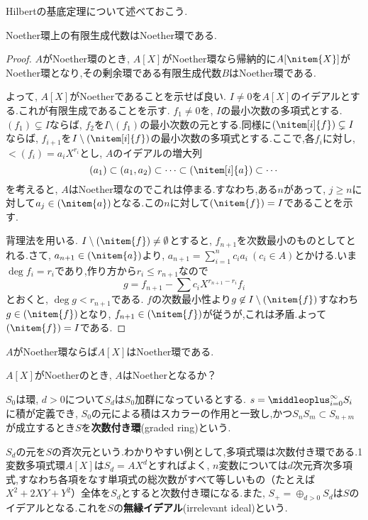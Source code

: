 Hilbertの基底定理について述べておこう.
\begin{thm}[Hilbertの基底定理]\label{thm:Hilbertの基底定理}
		Noether環上の有限生成代数はNoether環である.
	\end{thm}
	\begin{proof}
		$A$がNoether環のとき, $A[X]$がNoether環なら帰納的に$A[\nitem{X}]$がNoether環となり,その剰余環である有限生成代数$B$はNoether環である.
		
		よって, $A[X]$がNoetherであることを示せば良い. $I\neq0$を$A[X]$のイデアルとする.これが有限生成であることを示す. $f_1\neq0$を, $I$の最小次数の多項式とする. $(f_1)\subsetneq I$ならば, $f_2$を$I\setminus(f_1)$の最小次数の元とする.同様に$(\nitem[i]{f})\subsetneq I$ならば, $f_{i+1}$を$I\setminus(\nitem[i]{f})$の最小次数の多項式とする.ここで,各$f_i$に対し, $\lt(f_i)=a_iX^{r_i}$とし, $A$のイデアルの増大列
		\[(a_1)\subset(a_1,a_2)\subset\dots\subset(\nitem[i]{a})\subset\cdots\]
		を考えると, $A$はNoether環なのでこれは停まる.すなわち,ある$n$があって, $j\geq n$に対して$a_j\in(\nitem{a})$となる.この$n$に対して$(\nitem{f})=I$であることを示す.
		
		背理法を用いる. $I\setminus(\nitem{f})\neq\emptyset$とすると, $f_{n+1}$を次数最小のものとしてとれる.さて, $a_{n+1}\in(\nitem{a})$より, $a_{n+1}=\sum_{i=1}^n c_ia_i~(c_i\in A)$とかける.いま$\deg{f_i}=r_i$であり,作り方から$r_i\leq r_{n+1}$なので
		\[g=f_{n+1}-\sum c_iX^{r_{n+1}-r_i}f_i\]
		とおくと, $\deg g<r_{n+1}$である. $f$の次数最小性より$g\not\in I\setminus(\nitem{f})$すなわち$g\in(\nitem{f})$となり, $f_{n+1}\in(\nitem{f})$が従うが,これは矛盾.よって$(\nitem{f})=I$である.
\end{proof}

\begin{cor}
	$A$がNoether環ならば$A[X]$はNoether環である.
\end{cor}

\begin{exer}
	$A[X]$がNoetherのとき, $A$はNoetherとなるか？
\end{exer}

\begin{defi}[次数付き環]
	$S_0$は環, $d>0$について$S_d$は$S_0$加群になっているとする. $s=\middleoplus_{i=0}^\infty S_i$に積が定義でき, $S_0$の元による積はスカラーの作用と一致し,かつ$S_nS_m\subset S_{n+m}$が成立するとき$S$を\textbf{次数付き環}(graded ring)という.
\end{defi}

$S_d$の元を$S$の斉次元という.わかりやすい例として,多項式環は次数付き環である.1変数多項式環$A[X]$は$S_d=AX^d$とすればよく, $n$変数については$d$次元斉次多項式,すなわち各項をなす単項式の総次数がすべて等しいもの（たとえば$X^2+2XY+Y^2$）全体を$S_d$とすると次数付き環になる.また, $S_+=\oplus_{d>0}S_d$は$S$のイデアルとなる.これを$S$の\textbf{無縁イデアル}(irrelevant ideal)という.

